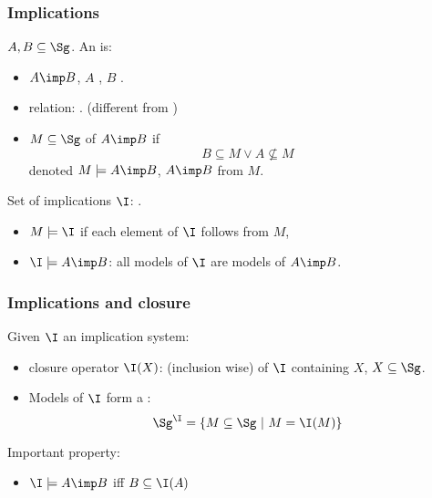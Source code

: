 \begin{frame}
\frametitle{Implications}

$A, B \subseteq \Sg$. An  is:
\begin{itemize}
	\item $A \imp B$, $A$ , $B$ .
	\item relation: . (different from 
	)
	\item $M \subseteq \Sg$  of $A \imp B$ if
		 \[B \subseteq M \lor A \nsubseteq M \]
	denoted $M \models A \imp B$, $A \imp B$  from $M$.
\end{itemize}

\vspace{0.5em}

Set of implications $\I$: .
\begin{itemize}
	\item $M \models \I$ if each element of $\I$ follows from $M$,
	\item $\I \models A \imp B$: all models of $\I$ are models of $A \imp B$.
\end{itemize}

\end{frame}


\begin{frame}
\frametitle{Implications and closure}

Given $\I$ an implication system:
\begin{itemize}
	\item closure operator $\I(X)$:  (inclusion wise) of 
	$\I$ containing $X$, $X \subseteq \Sg$. 
	\item Models of $\I$ form a :
		\[ \Sg^{\I} = \{ M \subseteq \Sg \ | \ M = \I(M) \} \]
\end{itemize}

\vspace{1.2em}

\begin{lightreminder}
Important property:
\begin{itemize}
	\item $\I \models A \imp B$ iff $B \subseteq \I(A)$
\end{itemize}
\end{lightreminder}

\end{frame}

